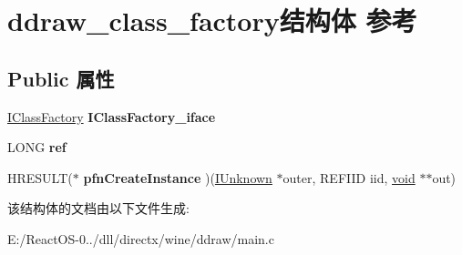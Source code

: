 \hypertarget{structddraw__class__factory}{}\section{ddraw\+\_\+class\+\_\+factory结构体 参考}
\label{structddraw__class__factory}
\subsection*{Public 属性}
\begin{DoxyCompactItemize}
\item 
\mbox{\label{structddraw__class__factory_a2cacdf9f860ae9291ec7354d0b0c2b97}} 
\hyperlink{interface_i_class_factory}{I\+Class\+Factory} {\bfseries I\+Class\+Factory\+\_\+iface}
\item 
\mbox{\label{structddraw__class__factory_a292f80209dd6b837595ef04c4c56c101}} 
L\+O\+NG {\bfseries ref}
\item 
\mbox{\label{structddraw__class__factory_a590698f60d7b4b9b9d69a409aff662b2}} 
H\+R\+E\+S\+U\+LT($\ast$ {\bfseries pfn\+Create\+Instance} )(\hyperlink{interface_i_unknown}{I\+Unknown} $\ast$outer, R\+E\+F\+I\+ID iid, \hyperlink{interfacevoid}{void} $\ast$$\ast$out)
\end{DoxyCompactItemize}


该结构体的文档由以下文件生成\+:\begin{DoxyCompactItemize}
\item 
E\+:/\+React\+O\+S-\/0../dll/directx/wine/ddraw/main.\+c\end{DoxyCompactItemize}
